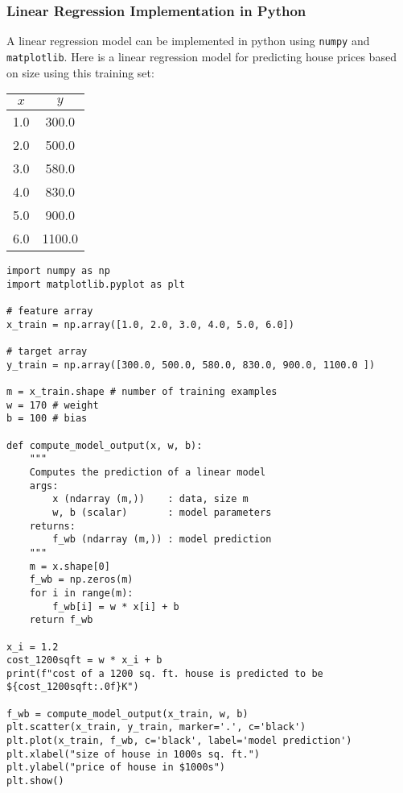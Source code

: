 \documentclass{article}
\begin{document}
\subsubsection{Linear Regression Implementation in Python}
A linear regression model can be implemented in python using \texttt{numpy} and \texttt{matplotlib}. Here is a linear regression model for predicting house prices based on size using this training set:

\begin{center}
\centering
\begin{tabular}{|c|c|} 
\hline
\textbf{$x$} & \textbf{$y$} \\ 
\hline
1.0 & 300.0 \\ 
\hline
2.0 & 500.0 \\ 
\hline
3.0 & 580.0 \\ 
\hline
4.0 & 830.0 \\ 
\hline
5.0 & 900.0 \\ 
\hline
6.0 & 1100.0 \\ 
\hline
\end{tabular}
\end{center}

\begin{lstlisting}[caption={Python Code for Linear Regression}]
import numpy as np
import matplotlib.pyplot as plt

# feature array
x_train = np.array([1.0, 2.0, 3.0, 4.0, 5.0, 6.0])

# target array
y_train = np.array([300.0, 500.0, 580.0, 830.0, 900.0, 1100.0 ])

m = x_train.shape # number of training examples
w = 170 # weight
b = 100 # bias

def compute_model_output(x, w, b):
    """
    Computes the prediction of a linear model
    args:
        x (ndarray (m,))    : data, size m
        w, b (scalar)       : model parameters
    returns:
        f_wb (ndarray (m,)) : model prediction
    """
    m = x.shape[0]
    f_wb = np.zeros(m)
    for i in range(m):
        f_wb[i] = w * x[i] + b
    return f_wb

x_i = 1.2
cost_1200sqft = w * x_i + b
print(f"cost of a 1200 sq. ft. house is predicted to be ${cost_1200sqft:.0f}K")

f_wb = compute_model_output(x_train, w, b)
plt.scatter(x_train, y_train, marker='.', c='black')
plt.plot(x_train, f_wb, c='black', label='model prediction')
plt.xlabel("size of house in 1000s sq. ft.")
plt.ylabel("price of house in $1000s")
plt.show()
\end{lstlisting}
\vfill
\end{document}
